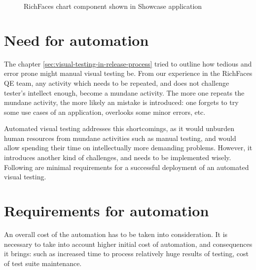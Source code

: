 \documentclass[11pt,oneside,final]{fithesis2}
\begin{document}
  \begin{figure}[!htb]
    \begin{center}
    \leavevmode
    \centerline{}
    \end{center}
    \caption{RichFaces chart component shown in Showcase application}
    \label{fig:richfaces_chart} 
  \end{figure}
  
  \section{Need for automation}
  The chapter \ref{sec:visual-testing-in-release-process} tried to outline how tedious and error prone might manual visual testing be. From our experience in the RichFaces QE team, any activity
  which needs to be repeated, and does not challenge tester's intellect enough, become a mundane activity. The more one repeats the mundane activity, the more likely an mistake is introduced:
  one forgets to try some use cases of an application, overlooks some minor errors, etc.
  
  Automated visual testing addresses this shortcomings, as it would unburden human resources from mundane activities such as manual testing, and would allow spending their
  time on intellectually more demanding problems. However, it introduces another kind of challenges, and needs to be implemented wisely. Following are minimal requirements 
  for a successful deployment of an automated visual testing.
      
  \section{Requirements for automation}
  \label{sec:requirementsForAutomation}
  An overall cost of the automation has to be taken into consideration. It is necessary to take into account higher initial cost of automation, and consequences it brings: 
  such as increased time to process relatively huge results of testing, cost of test suite maintenance.
  
\end{document}
